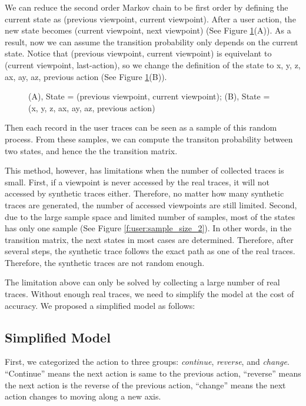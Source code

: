 We can reduce the second order Markov chain to be first order by defining the current state as
(previous viewpoint, current viewpoint). After a user action, the new state becomes 
(current viewpoint, next viewpoint) (See Figure \ref{f:user:reduction}(A)). 
As a result, now we can assume the transition probability only depends on the current state.
Notice that (previous viewpoint, current viewpoint) is equivelant to (current viewpoint, last-action), 
so we change the definition of the state to {x, y, z, ax, ay, az, previous action} 
(See Figure \ref{f:user:reduction}(B)).
\begin{figure}
    \centering
    \caption{(A), State = (previous viewpoint, current viewpoint); (B), State = (x, y, z, ax, ay, az, previous action)}
    \label{f:user:reduction}
\end{figure}

Then each record in the user traces can be seen as a sample of this random process.
From these samples, we can compute the transiton probability between two states, and hence
the the transition matrix.

This method, however, has limitations when the number of collected traces is small. First, if a viewpoint is 
never accessed by the real traces, it will not accessed by synthetic traces either. Therefore, no matter how
many synthetic traces are generated, the number of accessed viewpoints are still limited. Second, due to
the large sample space and limited number of samples, most of the states has only one sample
(See Figure \ref{f:user:sample_size_2}). 
In other words, in the transition matrix, the next states in most cases are determined. 
Therefore, after several steps, the synthetic trace follows the exact path as one of the real traces. 
Therefore, the synthetic traces are not random enough.

The limitation above can only be solved by collecting a large number of real traces. Without enough real traces,
we need to simplify the model at the cost of accuracy. We proposed a simplified model as follows:

\subsection{Simplified Model}
First, we categorized the action to three groups: \textit{continue}, \textit{reverse}, and \textit{change}. 
``Continue'' means the next action is same to the previous action, ``reverse'' means the next action
is the reverse of the previous action, ``change'' means the next action changes to moving along a new axis.

